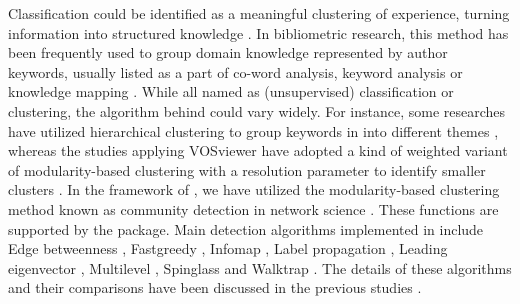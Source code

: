 Classification could be identified as a meaningful clustering of
experience, turning information into structured knowledge
\citep{kwasnik1999role}. In bibliometric research, this method has been
frequently used to group domain knowledge represented by author
keywords, usually listed as a part of co-word analysis, keyword analysis
or knowledge mapping
\citep{he1999knowledge, hu2013co, leung2017bibliometrics, li2017knowledge, wang2018three}.
While all named as (unsupervised) classification or clustering, the
algorithm behind could vary widely. For instance, some researches have
utilized hierarchical clustering to group keywords in into different
themes \citep{hu2015research, khasseh2017intellectual}, whereas the
studies applying VOSviewer have adopted a kind of weighted variant of
modularity-based clustering with a resolution parameter to identify
smaller clusters \citep{van2010software}. In the framework of
, we have utilized the modularity-based clustering method
known as community detection in network science
\citep{newman2004fast, Murata2010}. These functions are supported by the
 package. Main detection algorithms implemented in
 include Edge betweenness \citep{girvan2002community},
Fastgreedy \citep{Clauset}, Infomap
\citep{rosvall2007information, rosvall2009map}, Label propagation
\citep{raghavan2007near}, Leading eigenvector \citep{newman2006finding},
Multilevel \citep{Blondel_2008}, Spinglass
\citep{reichardt2006statistical} and Walktrap \citep{pons2005computing}.
The details of these algorithms and their comparisons have been
discussed in the previous studies
\citep{de2014evaluating, yang2016comparative, garg2017comparative, 8620850}.

